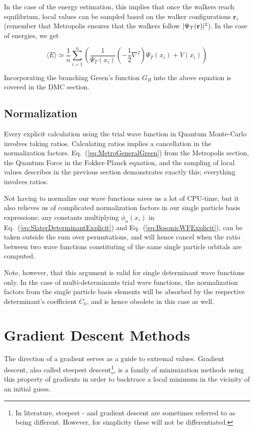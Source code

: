 In the case of the energy estimation, this implies that once the walkers reach equilibrium, local values can be sampled based on the walker configurations $\mathbf{r}_i$ (remember that Metropolis ensures that the walkers follow $|\Psi_T(\mathbf{r})|^2$). In the case of energies, we get

\begin{equation}
 \langle E \rangle \simeq \frac{1}{n}\sum_{i=1}^n \left(\frac{1}{\Psi_T(x_i)}\left(-\frac{1}{2}\nabla^2\right)\Psi_T(x_i) + V(x_i)\right)
\end{equation}

Incorporating the branching Green's function $G_B$ into the above equation is covered in the DMC section.

\subsection{Normalization}

Every explicit calculation using the trial wave function in Quantum Monte-Carlo involves taking ratios. Calculating ratios implies a cancellation in the normalization factors. Eq.~(\ref{eq:MetroGeneralGreen}) from the Metropolis section, the Quantum Force in the Fokker-Planck equation, and the sampling of local values describes in the previous section demonstrates exactly this; everything involves ratios.

Not having to normalize our wave functions saves us a lot of CPU-time, but it also relieves us of complicated normalization factors in our single particle basis expressions; any constants multiplying $\phi_n(x_i)$ in Eq.~(\ref{eq:SlaterDeterminantExplicit}) and Eq.~(\ref{eq:BosonicWFExplicit}), can be taken outside the sum over permutations, and will hence cancel when the ratio between two wave functions constituting of the same single particle orbitals are computed. 

Note, however, that this argument is valid for single determinant wave functions only. In the case of multi-determinants trial wave functions, the normalization factors from the single particle basis elements will be absorbed by the respective determinant's coefficient $C_k$, and is hence obsolete in this case as well. 

\section{Gradient Descent Methods}
\label{sec:GradientDescent}

The direction of a gradient serves as a guide to extremal values. Gradient descent, also called steepest descent\footnote{In literature, steepest - and gradient descent are sometimes referred to as being different. However, for simplicity these will not be differentiated.}, is a family of minimization methods using this property of gradients in order to backtrace a local minimum in the vicinity of an initial guess. 

